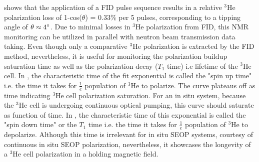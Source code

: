  shows that the application of a FID pulse sequence results in a relative $^3$He polarization loss of 1-cos($\theta$) = 0.33\% per 5 pulses, corresponding to a tipping angle of $\theta \approx 4\degree$. Due to minimal losses in $^3$He polarization from FID, this NMR monitoring can be utilized in parallel with neutron beam transmission data taking. Even though only a comparative $^3$He polarization is extracted by the FID method, nevertheless, it is useful for monitoring the polarization buildup saturation time as well as the polarization decay ($T_1$ time) i.e lifetime of the $^3$He cell. In , the characteristic time of the fit exponential is called the "spin up time" i.e. the time it takes for $\frac{1}{e}$ population of $^3$He to polarize. The curve plateaus off as time indicating $^3$He cell polarization saturation. For an in situ system, because the $^3$He cell is undergoing continuous optical pumping, this curve should saturate as function of time. In , the characteristic time of this exponential is called the "spin down time" or the $T_1$ time i.e. the time it takes for $\frac{1}{e}$ population of $^3$He to depolarize. Although this time is irrelevant for in situ SEOP systems, courtesy of continuous in situ SEOP polarization, nevertheless, it showcases the longevity of a $^3$He cell polarization in a holding magnetic field.



